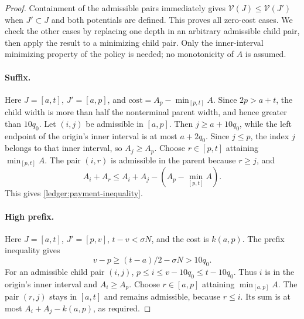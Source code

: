 \begin{proof}
Containment of the admissible pairs immediately gives
\(\mathcal V(J)\le\mathcal V(J')\) when \(J'\subset J\) and
both potentials are defined.  This proves all zero-cost cases.
We check the other cases by replacing one depth in an arbitrary
admissible child pair, then apply the result to a minimizing child
pair.  Only the inner-interval minimizing property of the policy is
needed; no monotonicity of \(A\) is assumed.

\paragraph{Suffix.}
Here \(J=[a,t]\), \(J'=[a,p]\), and
\(\mathrm{cost}=A_p-\min_{[p,t]}A\).
Since \(2p>a+t\), the child width is more than half the nonterminal
parent width, and hence greater than \(10q_0\).
Let \((i,j)\) be admissible in \([a,p]\).  Then
\(j\ge a+10q_0\), while the left endpoint of the origin's inner
interval is at most \(a+2q_0\).  Since \(j\le p\), the index
\(j\) belongs to that inner interval, so \(A_j\ge A_p\).
Choose \(r\in[p,t]\) attaining \(\min_{[p,t]}A\).
The pair \((i,r)\) is admissible in the parent because
\(r\ge j\), and
\[
 A_i+A_r\le A_i+A_j-
          \left(A_p-\min_{[p,t]}A\right).
\]
This gives \eqref{ledger:payment-inequality}.

\paragraph{High prefix.}
Here \(J=[a,t]\), \(J'=[p,v]\), \(t-v<\sigma N\), and the
cost is \(k(a,p)\).  The prefix inequality gives
\[
 v-p\ge(t-a)/2-\sigma N>10q_0.
\]
For an admissible child pair \((i,j)\),
\(p\le i\le v-10q_0\le t-10q_0\).  Thus \(i\) is in the
origin's inner interval and \(A_i\ge A_p\).
Choose \(r\in[a,p]\) attaining \(\min_{[a,p]}A\).
The pair \((r,j)\) stays in \([a,t]\) and remains admissible,
because \(r\le i\).  Its sum is at most
\(A_i+A_j-k(a,p)\), as required.


\end{proof}
